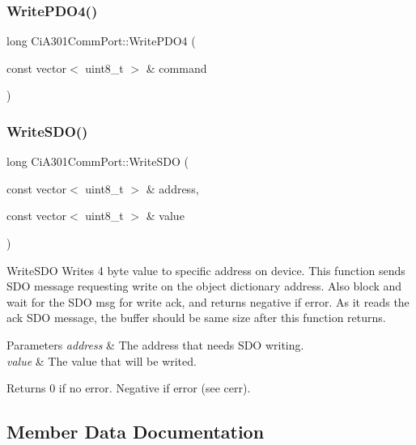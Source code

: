 \subsubsection{\texorpdfstring{Write\+P\+D\+O4()}{WritePDO4()}}
{\footnotesize\ttfamily long Ci\+A301\+Comm\+Port\+::\+Write\+P\+D\+O4 (\begin{DoxyParamCaption}\item[{const vector$<$ uint8\+\_\+t $>$ \&}]{command }\end{DoxyParamCaption})}

\mbox{\label{classCiA301CommPort_a4d97c27423b2323f8475f6e5c2f91575}} 
\subsubsection{\texorpdfstring{Write\+S\+D\+O()}{WriteSDO()}}
{\footnotesize\ttfamily long Ci\+A301\+Comm\+Port\+::\+Write\+S\+DO (\begin{DoxyParamCaption}\item[{const vector$<$ uint8\+\_\+t $>$ \&}]{address,  }\item[{const vector$<$ uint8\+\_\+t $>$ \&}]{value }\end{DoxyParamCaption})}



Write\+S\+DO Writes 4 byte value to specific address on device. This function sends S\+DO message requesting write on the object dictionary address. Also block and wait for the S\+DO msg for write ack, and returns negative if error. As it reads the ack S\+DO message, the buffer should be same size after this function returns. 


\begin{DoxyParams}{Parameters}
{\em address} & The address that needs S\+DO writing. \\
\hline
{\em value} & The value that will be writed. \\
\hline
\end{DoxyParams}
\begin{DoxyReturn}{Returns}
0 if no error. Negative if error (see cerr). 
\end{DoxyReturn}


\subsection{Member Data Documentation}
\mbox{\label{classCiA301CommPort_a1ae075d22fc854da21a6e691bb029fc0}} 
